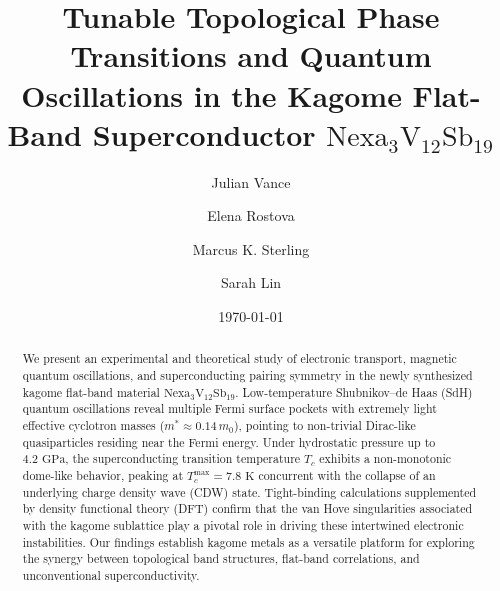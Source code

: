 \documentclass[aps,prb,reprint,superscriptaddress,amsmath,amssymb,citeautoscript]{revtex4-2}
\begin{document}
\title{Tunable Topological Phase Transitions and Quantum Oscillations in the Kagome Flat-Band Superconductor \texorpdfstring{$\mathrm{Nexa}_{3}\mathrm{V}_{12}\mathrm{Sb}_{19}$}{Nexa3V12Sb19}}

\author{Julian Vance}

\author{Elena Rostova}

\author{Marcus K. Sterling}

\author{Sarah Lin}

\date{\today}

\begin{abstract}
We present an experimental and theoretical study of electronic transport, magnetic quantum oscillations, and superconducting pairing symmetry in the newly synthesized kagome flat-band material $\mathrm{Nexa}_{3}\mathrm{V}_{12}\mathrm{Sb}_{19}$. Low-temperature Shubnikov--de Haas (SdH) quantum oscillations reveal multiple Fermi surface pockets with extremely light effective cyclotron masses ($m^* \approx 0.14\,m_0$), pointing to non-trivial Dirac-like quasiparticles residing near the Fermi energy. Under hydrostatic pressure up to $4.2\text{~GPa}$, the superconducting transition temperature $T_c$ exhibits a non-monotonic dome-like behavior, peaking at $T_c^{\text{max}} = 7.8\text{~K}$ concurrent with the collapse of an underlying charge density wave (CDW) state. Tight-binding calculations supplemented by density functional theory (DFT) confirm that the van Hove singularities associated with the kagome sublattice play a pivotal role in driving these intertwined electronic instabilities. Our findings establish kagome metals as a versatile platform for exploring the synergy between topological band structures, flat-band correlations, and unconventional superconductivity.
\end{abstract}

\maketitle
\end{document}
